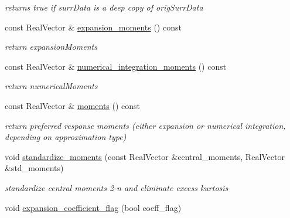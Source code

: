 \begin{DoxyCompactItemize}
\begin{DoxyCompactList}\small\item\em returns true if surr\+Data is a deep copy of orig\+Surr\+Data \end{DoxyCompactList}\item 
const Real\+Vector \& \hyperlink{classPecos_1_1PolynomialApproximation_a866d58cb48bf4b186438893130785811}{expansion\+\_\+moments} () const \label{classPecos_1_1PolynomialApproximation_a866d58cb48bf4b186438893130785811}

\begin{DoxyCompactList}\small\item\em return expansion\+Moments \end{DoxyCompactList}\item 
const Real\+Vector \& \hyperlink{classPecos_1_1PolynomialApproximation_ae595e64f70b8dcb174bf76438d2df19a}{numerical\+\_\+integration\+\_\+moments} () const \label{classPecos_1_1PolynomialApproximation_ae595e64f70b8dcb174bf76438d2df19a}

\begin{DoxyCompactList}\small\item\em return numerical\+Moments \end{DoxyCompactList}\item 
const Real\+Vector \& \hyperlink{classPecos_1_1PolynomialApproximation_a05509beee5c681b6a6af6344c54ef85c}{moments} () const 
\begin{DoxyCompactList}\small\item\em return preferred response moments (either expansion or numerical integration, depending on approximation type) \end{DoxyCompactList}\item 
void \hyperlink{classPecos_1_1PolynomialApproximation_a9b8b15104b9fcb415f36502df2319a89}{standardize\+\_\+moments} (const Real\+Vector \&central\+\_\+moments, Real\+Vector \&std\+\_\+moments)\label{classPecos_1_1PolynomialApproximation_a9b8b15104b9fcb415f36502df2319a89}

\begin{DoxyCompactList}\small\item\em standardize central moments 2-\/n and eliminate excess kurtosis \end{DoxyCompactList}\item 
void \hyperlink{classPecos_1_1PolynomialApproximation_a725333d01cc0f8dc70b251218cfa186f}{expansion\+\_\+coefficient\+\_\+flag} (bool coeff\+\_\+flag)\label{classPecos_1_1PolynomialApproximation_a725333d01cc0f8dc70b251218cfa186f}


\end{DoxyCompactItemize}
